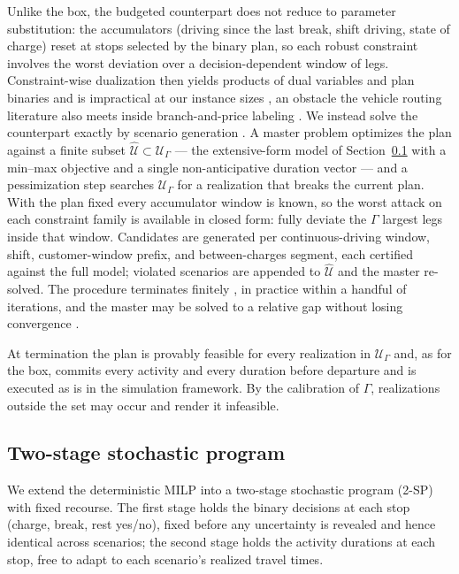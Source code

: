 \documentclass[preprint,12pt,3p]{elsarticle}
\begin{document}
Unlike the box, the budgeted counterpart does not reduce to parameter substitution: the accumulators (driving since the last break, shift driving, state of charge) reset at stops selected by the binary plan, so each robust constraint involves the worst deviation over a decision-dependent window of legs. Constraint-wise dualization then yields products of dual variables and plan binaries and is impractical at our instance sizes \citep{poss_robust_2013}, an obstacle the vehicle routing literature also meets inside branch-and-price labeling \citep{munari_robust_2019}.
We instead solve the counterpart exactly by scenario generation \citep{mutapcic_cutting-set_2009, zeng_solving_2013}. A master problem optimizes the plan against a finite subset $\widehat{\mathcal U} \subset \mathcal U_\Gamma$ --- the extensive-form model of Section~\ref{sec:sp} with a min--max objective and a single non-anticipative duration vector --- and a pessimization step searches $\mathcal U_\Gamma$ for a realization that breaks the current plan. With the plan fixed every accumulator window is known, so the worst attack on each constraint family is available in closed form: fully deviate the $\Gamma$ largest legs inside that window. Candidates are generated per continuous-driving window, shift, customer-window prefix, and between-charges segment, each certified against the full model; violated scenarios are appended to $\widehat{\mathcal U}$ and the master re-solved. The procedure terminates finitely \citep{zeng_solving_2013}, in practice within a handful of iterations, and the master may be solved to a relative gap without losing convergence \citep{patzold_approximate_2020}.

At termination the plan is provably feasible for every realization in $\mathcal U_\Gamma$ and, as for the box, commits every activity and every duration before departure and is executed as is in the simulation framework. By the calibration of $\Gamma$, realizations outside the set may occur and render it infeasible.


\subsection{Two-stage stochastic program}
\label{sec:sp}

We extend the deterministic MILP into a two-stage stochastic program (2-SP) with fixed recourse. The first stage holds the binary decisions at each stop (charge, break, rest yes/no), fixed before any uncertainty is revealed and hence identical across scenarios;
the second stage holds the activity durations at each stop, free to adapt to each scenario's realized travel times.
\end{document}
